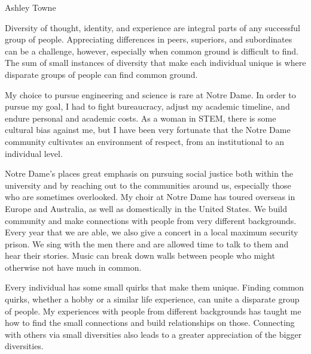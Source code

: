 \setlength{\oddsidemargin}{0in}
\setlength{\evensidemargin}{0in}
\setlength{\textwidth}{6.5in}
\setlength{\topmargin}{-.3in}
\setlength{\textheight}{9in}
\pagestyle{empty}



\begin{center}
{\large Ashley Towne}
\end{center}

\vspace*{.5in}
{Diversity of thought, identity, and experience are integral parts of any
    successful group of people. Appreciating differences in peers, superiors,
    and subordinates can be a challenge, however, especially when common ground
    is difficult to find. The sum of small instances of diversity that make
    each individual unique is where disparate groups of people can find common
    ground.

    My choice to pursue engineering and science is rare at Notre Dame. In order to
    pursue my goal, I had to fight bureaucracy, adjust my academic timeline,
    and endure personal and academic costs. As a woman in STEM,
    there is some cultural bias against me, but I have been very
    fortunate that the Notre Dame community cultivates an environment of
    respect, from an institutional to an individual level.

    Notre Dame's places great emphasis on pursuing social justice both within
    the university and by reaching out to the communities around us, especially
    those who are sometimes overlooked. My choir at Notre Dame has toured
    overseas in Europe and Australia, as well as domestically in the United
    States. We build community and make connections with people from very
    different backgrounds.  Every year that we are able, we also give a concert
    in a local maximum security prison. We sing with the men there and are
    allowed time to talk to them and hear their stories. Music can break down
    walls between people who might otherwise not have much in common.

    Every individual has some small quirks that make them unique. Finding
    common quirks, whether a hobby or a similar life experience, can unite a
    disparate group of people. My experiences with people from different
    backgrounds has taught me how to find the small connections and build
    relationships on those. Connecting with others via small diversities also
    leads to a greater appreciation of the bigger diversities.
}



